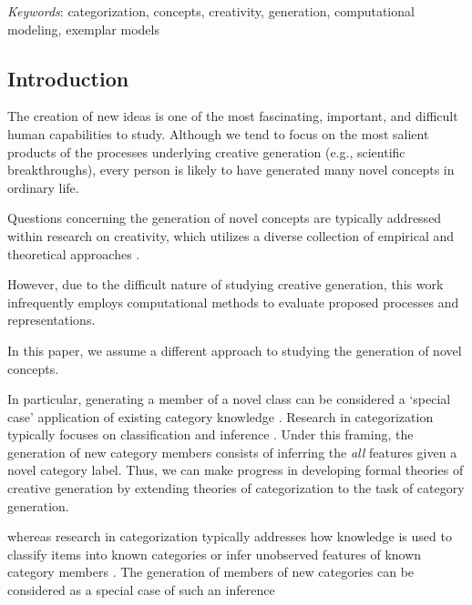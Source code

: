 \documentclass[12pt]{article}
\begin{document}
\setlength\parindent{0.5in}
{\em Keywords}: categorization, concepts, creativity, generation, computational modeling, exemplar models
\clearpage


\begin{flushleft}

\section{Introduction}
\setlength\parindent{0.5in}


The creation of new ideas is one of the most fascinating, important, and difficult human capabilities to study. Although we tend to focus on the most salient products of the processes underlying creative generation (e.g., scientific breakthroughs), every person is likely to have generated many novel concepts in ordinary life. 

Questions concerning the generation of novel concepts are typically addressed within research on creativity, which utilizes a diverse collection of empirical and theoretical approaches \citep[see][]{kaufman2010handbook}. 

However, due to the difficult nature of studying creative generation, this work infrequently employs computational methods to evaluate proposed processes and representations. 

In this paper, we assume a different approach to studying the generation of novel concepts.

In particular, generating a member of a novel class can be considered a `special case' application of existing category knowledge \citep{kemp2014taxonomy,kurtz2015human}. Research in categorization typically focuses on classification \citep[predicting the category given feature information, see][]{shepard1961learning,nosofsky1994comparing} and inference \citep[predicting unobserved features given observed features and a category label, see][]{markman2003category}. Under this framing, the generation of new category members consists of inferring the {\em all} features given a novel category label. Thus, we can make progress in developing formal theories of creative generation by extending theories of categorization to the task of category generation.

 whereas research in categorization typically addresses how knowledge is used to classify items into known categories  or infer unobserved features of known category members \citep[see][]{markman2003category}. The generation of members of new categories can be considered as a special case of such an inference 


\end{flushleft}
\end{document}
